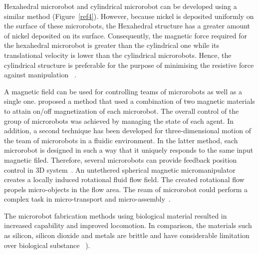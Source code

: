 \documentclass[a4paper,11pt]{article}
\begin{document}
\begin{sloppypar}
Hexahedral microrobot and cylindrical microrobot can be developed using a similar method (Figure~\ref{ref4}).
 However, because nickel is deposited uniformly on the surface of these microrobots, the 
Hexahedral structure has a greater amount of nickel deposited on its surface. Consequently, the 
magnetic force required for the hexahedral microrobot is greater than the cylindrical one while its 
translational velocity is lower than the cylindrical microrobots. Hence, the cylindrical structure is preferable
 for the purpose of minimising the resistive force against manipulation ~\citep{kim2013fabrication}. 


A magnetic field can be used for controlling teams of microrobots as well as a single 
one. \citeauthor{kim2013fabrication} proposed a method that used a combination of two magnetic materials to 
attain on/off magnetization of each microrobot. The overall control of the group of microrobots 
was achieved by managing the state of each agent. In addition, a second technique has been 
developed for three-dimensional motion of the team of microrobots in a fluidic environment. In
 the latter method, each microrobot is designed in such a way that it uniquely responds to the 
same input magnetic filed. Therefore, several microrobots can provide feedback position control in 
3D system~\citep{kim2013fabrication}.
An untethered spherical magnetic micromanipulator creates a locally induced rotational fluid flow field. 
The created rotational flow propels micro-objects in the flow area. The ream of microrobot could perform
 a complex task in micro-transport and micro-assembly~\citep{kim2013fabrication}. 


The microrobot fabrication methods using biological material resulted in increased capability 
and improved locomotion. In comparison, the materials such as silicon, silicon dioxide and metals are 
brittle and have considerable limitation over biological substance ~\citep{vogtmann2013modeling}). 



\end{sloppypar}
\end{document}
